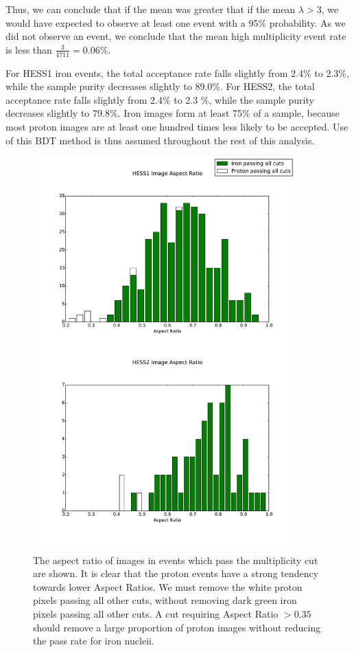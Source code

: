 \documentclass{article}
\begin{document}
Thus, we can conclude that if the mean was greater that if the mean $\lambda>3$, we would have expected to observe at least one event with a 95\% probability. As we did not observe an event, we conclude that the mean high multiplicity event rate is less than $\frac{3}{4711}=0.06\%$. 

For HESS1 iron events, the total acceptance rate falls slightly from 2.4\% to 2.3\%, while the sample purity decreases slightly to 89.0\%. For HESS2, the total acceptance rate falls slightly from 2.4\% to 2.3 \%, while the sample purity decreases slightly to 79.8\%. Iron images form at least 75\% of a sample, because most proton images are at least one hundred times less likely to be accepted. Use of this BDT method is thus assumed throughout the rest of this analysis.

\begin{figure}
\begin{center}
\includegraphics[width=0.9\textwidth]{aspectratio}
\caption{The aspect ratio of images in events which pass the multiplicity cut are shown. It is clear that the proton events have a strong tendency towards lower Aspect Ratios. We must remove the white proton pixels passing all other cuts, without removing dark green iron pixels passing all other cuts. A cut requiring Aspect Ratio $> 0.35$ should remove a large proportion of proton images without reducing the pass rate for iron nucleii.}
\label{fig:aspectratio}
\end{center}
\end{figure}
\end{document}
